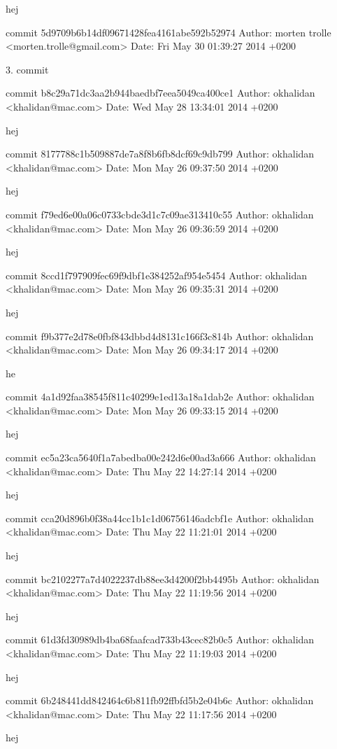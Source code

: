 \documentclass[12pt]{article}   %
\begin{document}
    hej

commit 5d9709b6b14df09671428fea4161abe592b52974
Author: morten trolle <morten.trolle@gmail.com>
Date:   Fri May 30 01:39:27 2014 +0200

    3. commit

commit b8c29a71dc3aa2b944baedbf7eea5049ca400ce1
Author: okhalidan <khalidan@mac.com>
Date:   Wed May 28 13:34:01 2014 +0200

    hej

commit 8177788c1b509887de7a8f8b6fb8dcf69c9db799
Author: okhalidan <khalidan@mac.com>
Date:   Mon May 26 09:37:50 2014 +0200

    hej

commit f79ed6e00a06c0733cbde3d1c7c09ae313410c55
Author: okhalidan <khalidan@mac.com>
Date:   Mon May 26 09:36:59 2014 +0200

    hej

commit 8ccd1f797909fec69f9dbf1e384252af954e5454
Author: okhalidan <khalidan@mac.com>
Date:   Mon May 26 09:35:31 2014 +0200

    hej

commit f9b377e2d78e0fbf843dbbd4d8131c166f3c814b
Author: okhalidan <khalidan@mac.com>
Date:   Mon May 26 09:34:17 2014 +0200

    he

commit 4a1d92faa38545f811c40299e1ed13a18a1dab2e
Author: okhalidan <khalidan@mac.com>
Date:   Mon May 26 09:33:15 2014 +0200

    hej

commit ec5a23ca5640f1a7abedba00e242d6e00ad3a666
Author: okhalidan <khalidan@mac.com>
Date:   Thu May 22 14:27:14 2014 +0200

    hej

commit cca20d896b0f38a44cc1b1c1d06756146adcbf1e
Author: okhalidan <khalidan@mac.com>
Date:   Thu May 22 11:21:01 2014 +0200

    hej

commit bc2102277a7d4022237db88ee3d4200f2bb4495b
Author: okhalidan <khalidan@mac.com>
Date:   Thu May 22 11:19:56 2014 +0200

    hej

commit 61d3fd30989db4ba68faafcad733b43cec82b0c5
Author: okhalidan <khalidan@mac.com>
Date:   Thu May 22 11:19:03 2014 +0200

    hej

commit 6b248441dd842464c6b811fb92ffbfd5b2e04b6c
Author: okhalidan <khalidan@mac.com>
Date:   Thu May 22 11:17:56 2014 +0200

    hej
\end{document}
